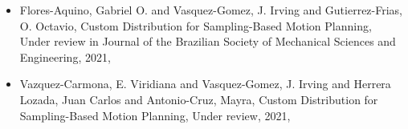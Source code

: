 \begin{itemize} 
\item Flores-Aquino, Gabriel O. and Vasquez-Gomez, J. Irving and Gutierrez-Frias, O. Octavio, Custom Distribution for Sampling-Based Motion Planning, Under review in Journal of the Brazilian Society of Mechanical Sciences and Engineering, 2021, \href{ https://arxiv.org/abs/2104.10292 }{\faFilePdfO} 
\item Vazquez-Carmona, E. Viridiana and Vasquez-Gomez, J. Irving and Herrera Lozada, Juan Carlos and Antonio-Cruz, Mayra, Custom Distribution for Sampling-Based Motion Planning, Under review, 2021, \href{ https://arxiv.org/abs/2105.08743 }{\faFilePdfO} 
\end{itemize} 
